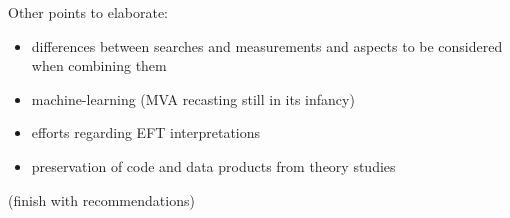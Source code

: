 \documentclass[11pt]{article}
\begin{document}
%
%

Other points to elaborate:
\begin{itemize}
    \item differences between searches and measurements and aspects to be considered when combining them
    \item machine-learning (MVA recasting still in its infancy)
    \item efforts regarding EFT interpretations
    \item preservation of code and data products from theory studies
\end{itemize}

(finish with recommendations)
\end{document}
